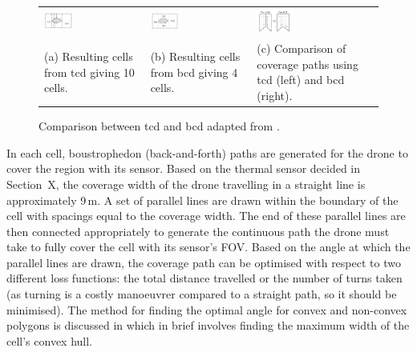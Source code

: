 \begin{figure}[h!]
    \centering
    \begin{tabular}{p{}p{}p{}}
        \includegraphics[width=0.3\textwidth]{figs/Jihwan/choset_tcd.pdf} &
        \includegraphics[width=0.3\textwidth]{figs/Jihwan/choset_bcd.pdf} &
        \includegraphics[width=0.3\textwidth]{figs/Jihwan/choset_bcd_tcd_comparison.pdf} \\
        \centering (a) Resulting cells from \gls{tcd} giving 10 cells. & 
        \centering (b) Resulting cells from \gls{bcd} giving 4 cells. & 
        \centering (c) Comparison of coverage paths using \gls{tcd} (left) and \gls{bcd} (right).
    \end{tabular}
    \caption[Comparison between TCD and BCD]
    {Comparison between \gls{tcd} and \gls{bcd} adapted from \cite{choset1998bcd}.}
    \label{fig:msp_choset}
\end{figure}

In each cell, boustrophedon (back-and-forth) paths are generated for the drone to cover the region with its sensor. Based on the thermal sensor decided in Section~X, the coverage width of the drone travelling in a straight line is approximately 9\,m. A set of parallel lines are drawn within the boundary of the cell with spacings equal to the coverage width. The end of these parallel lines are then connected appropriately to generate the continuous path the drone must take to fully cover the cell with its sensor's \gls{FOV}. Based on the angle at which the parallel lines are drawn, the coverage path can be optimised with respect to two different loss functions: the total distance travelled or the number of turns taken (as turning is a costly manoeuvrer compared to a straight path, so it should be minimised). The method for finding the optimal angle for convex and non-convex polygons is discussed in \cite{torres2016cpp} which in brief involves finding the maximum width of the cell's convex hull. 

